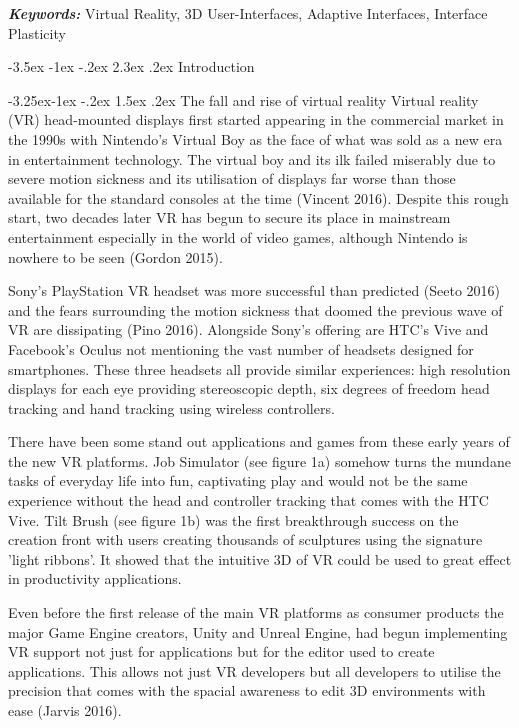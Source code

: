 \documentclass[12pt]{article}
\makeatletter
\providecommand{\keywords}[1]
{\textbf{\textit{Keywords: }} #1}
\renewcommand{\section}{\@startsection {section}{1}{\z@}%
             {-3.5ex \@plus -1ex \@minus -.2ex}%
             {2.3ex \@plus .2ex}%
             {\normalfont\Large\scshape\bfseries}}
\renewcommand{\subsection}{\@startsection{subsection}{2}{\z@}%
             {-3.25ex\@plus -1ex \@minus -.2ex}%
             {1.5ex \@plus .2ex}%
             {\normalfont\large\scshape\bfseries}}
\makeatother
\begin{document}
\keywords{Virtual Reality, 3D User-Interfaces, Adaptive Interfaces, Interface Plasticity}

\section{Introduction}

\subsection{The fall and rise of virtual reality}
Virtual reality (VR) head-mounted displays first started appearing in the commercial market in the 1990s with Nintendo's Virtual Boy as the face of what was sold as a new era in entertainment technology. The virtual boy and its ilk failed miserably due to severe motion sickness and its utilisation of displays far worse than those available for the standard consoles at the time (Vincent 2016). Despite this rough start, two decades later VR has begun to secure its place in mainstream entertainment especially in the world of video games, although Nintendo is nowhere to be seen (Gordon 2015). 

Sony's PlayStation VR headset was more successful than predicted (Seeto 2016) and the fears surrounding the motion sickness that doomed the previous wave of VR are dissipating (Pino 2016). Alongside Sony's offering are HTC's Vive and Facebook's Oculus not mentioning the vast number of headsets designed for smartphones. These three headsets all provide similar experiences: high resolution displays for each eye providing stereoscopic depth, six degrees of freedom head tracking and hand tracking using wireless controllers. 

There have been some stand out applications and games from these early years of the new VR platforms. Job Simulator (see figure 1a) somehow turns the mundane tasks of everyday life into fun, captivating play and would not be the same experience without the head and controller tracking that comes with the HTC Vive. Tilt Brush (see figure 1b) was the first breakthrough success on the creation front with users creating thousands of sculptures using the signature 'light ribbons'. It showed that the intuitive 3D of VR could be used to great effect in productivity applications.

Even before the first release of the main VR platforms as consumer products the major Game Engine creators, Unity and Unreal Engine, had begun implementing VR support not just for applications but for the editor used to create applications. This allows not just VR developers but all developers to utilise the precision that comes with the spacial awareness to edit 3D environments with ease (Jarvis 2016).
\end{document}
